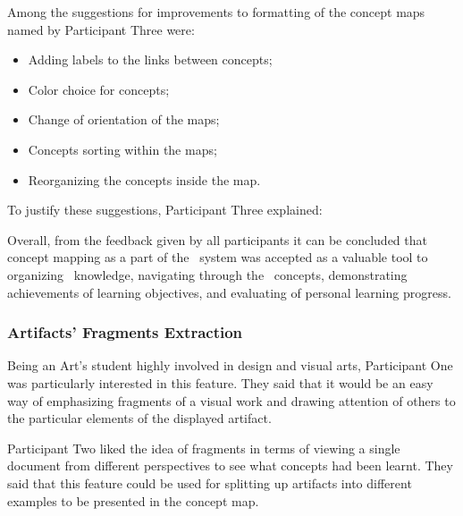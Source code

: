 
Among the suggestions for improvements to formatting of the concept maps
named by Participant Three were:
\begin{itemize}
  \item Adding labels to the links between concepts;
  \item Color choice for concepts;
  \item Change of orientation of the maps;
  \item Concepts sorting within the maps;
  \item Reorganizing the concepts inside the map.
\end{itemize}

To justify these suggestions, Participant Three explained:


Overall, from the feedback given by all participants it can be concluded that
concept mapping as a part of the \ep~system was accepted as a valuable tool to
organizing \ep~knowledge, navigating through the \ep~concepts, demonstrating
achievements of learning objectives, and evaluating of personal learning
progress.

\subsubsection{Artifacts' Fragments Extraction}

Being an Art's student highly involved in design and visual arts, Participant
One was particularly interested in this feature. They said that it would be an
easy way of emphasizing fragments of a visual work and drawing attention of
others to the particular elements of the displayed artifact.


Participant Two liked the idea of fragments in terms of viewing a single
document from different perspectives to see what concepts had been learnt. They
said that this feature could be used for splitting up artifacts into different
examples to be presented in the concept map.

